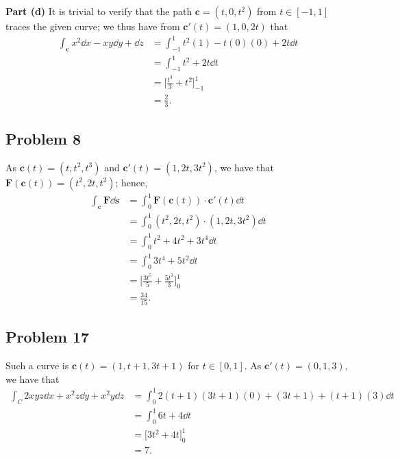 \documentclass[11pt]{article}
\renewcommand{\vec}[1]{\mathbf{#1}}
\newcommand{\mat}[1]{\mathbf{#1}}
\begin{document}
\textbf{Part (d)} It is trivial to verify that the path $\vec{c} = (t, 0, t^{2})$ from $t \in [-1, 1]$ traces the given curve; we thus have from $\vec{c}'(t) = (1, 0, 2t)$ that
\begin{align*}
	\int_{\vec{c}} x^{2} \dd{x} - xy \dd{y} + \dd{z} &= \int_{-1}^{1} t^{2} (1) - t(0)(0) + 2t \dd{t} \\
	&= \int_{-1}^{1} t^{2} + 2t \dd{t} \\
	&= \Big[ \frac{t^{3}}{3} + t^{2} \Big]_{-1}^{1} \\
	&= \boxed{\frac{2}{3}}.
\end{align*}


\subsection*{Problem 8}

As $\vec{c}(t) = (t, t^{2}, t^{3})$ and $\vec{c}'(t) = (1, 2t, 3t^{2})$, we have that $\mat{F}(\vec{c}(t)) = (t^{2}, 2t, t^{2})$; hence,
\begin{align*}
	\int_{\vec{c}} \mat{F} \dd{\vec{s}} &= \int_{0}^{1}  \mat{F}(\vec{c}(t)) \cdot \vec{c}'(t) \dd{t} \\
	&= \int_{0}^{1} (t^{2}, 2t, t^{2}) \cdot (1, 2t, 3t^{2}) \dd{t} \\
	&= \int_{0}^{1} t^{2} + 4t^{2} + 3t^{4} \dd{t} \\
	&= \int_{0}^{1} 3t^{4} + 5t^{2} \dd{t} \\
	&= \Big[ \frac{3t^{5}}{5} + \frac{5t^{3}}{3} \Big]_{0}^{1} \\
	&= \boxed{\frac{34}{15}}.
\end{align*}


\subsection*{Problem 17}

Such a curve is $\vec{c}(t) = (1, t + 1, 3t + 1)$ for $t \in [0, 1]$. As $\vec{c}'(t) = (0, 1, 3)$, we have that
\begin{align*}
	\int_{C} 2xyz \dd{x} + x^{2}z \dd{y} + x^{2}y \dd{z} &= \int_{0}^{1} 2(t + 1)(3t + 1)(0) + (3t + 1) + (t + 1)(3) \dd{t} \\
	&= \int_{0}^{1} 6t + 4 \dd{t} \\
	&= \Big[ 3t^{2} + 4t \Big]_{0}^{1} \\
	&= \boxed{7}.
\end{align*}
\end{document}
